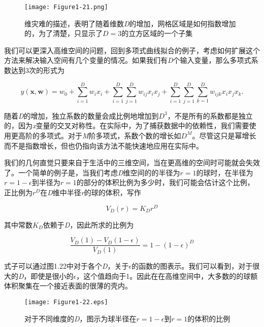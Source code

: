 	\begin{figure}[t]
		\parbox{.4\textwidth}{\caption{ 维灾难的描述，表明了随着维数\textit{D}的增加，网格区域是如何指数增加的，为了清楚，只显示了$D = 3$的立方区域的一个子集 }}
		\parbox{.5\textwidth}{\texttt{[image: Figure1-21.png]}}
	\end{figure}
	
	我们可以更深入高维空间的问题，回到多项式曲线拟合的例子，考虑如何扩展这个方法来解决输入空间有几个变量的情况。如果我们有\textit{D}个输入变量，那么多项式系数达到3次的形式为
	
	\begin{equation}
	y(\textbf{x},\textbf{w}) = w_0 + \sum_{i = 1}^{D} w_i x_i + \sum_{i = 1}^{D} \sum_{j = 1}^{D} w_{ij}x_i x_j + \sum_{i = 1}^{D} \sum_{j = 1}^{D} \sum_{k = 1}^{D} w_{ijk} x_i x_j x_k.
	\end{equation}
	
	随着\textit{D}的增加，独立系数的数量会成比例地增加到$D^3$，不是所有的系数都是独立的，因为\textit{x}变量的交叉对称性。在实际中，为了捕获数据中的依赖性，我们需要使用更高阶的多项式。对于\textit{M}阶多项式，系数个数的增长如$D^M$。尽管这只是幂增长而不是指数增长，但也仍指向该方法不能快速地应用在实际中。
	
	我们的几何直觉只要来自于生活中的三维空间，当在更高维的空间时可能就会失效了。一个简单的例子是，当我们考虑\textit{D}维空间的的半径为$r = 1$的球时，在半径为$r = 1 - \epsilon$到半径为$r = 1$的部分的体积比例为多少时，我们可能会估计这个比例，正比例为$r^D$在\textit{D}维中半径\textit{r}的球的体积，写作
	
	\begin{equation}
	V_D(r) = K_D r^D
	\end{equation}
	
	其中常数$K_D$依赖于\textit{D}，因此所求的比例为
	
	\begin{equation}
	\frac{V_D(1) - V_D(1 - \epsilon)}{V_D(1)} = 1 - (1 - \epsilon)^D
	\end{equation}
	
	式子可以通过图1.22中对于各个\textit{D}，关于$\epsilon$的函数的图表示。我们可以看到，对于很大的\textit{D}，即使是很小的$\epsilon$，这个值趋向于1。因此在在高维空间中，大多数的的球额体积聚集在一个接近表面的很薄的壳内。
	
	\begin{figure}[t]
		\parbox{.4\textwidth}{\caption{ 对于不同维度的\textit{D}，图示为球半径在$r = 1 - \epsilon$到$r = 1$的体积的比例 }}
		\parbox{.5\textwidth}{\texttt{[image: Figure1-22.eps]}}
	\end{figure}
	
